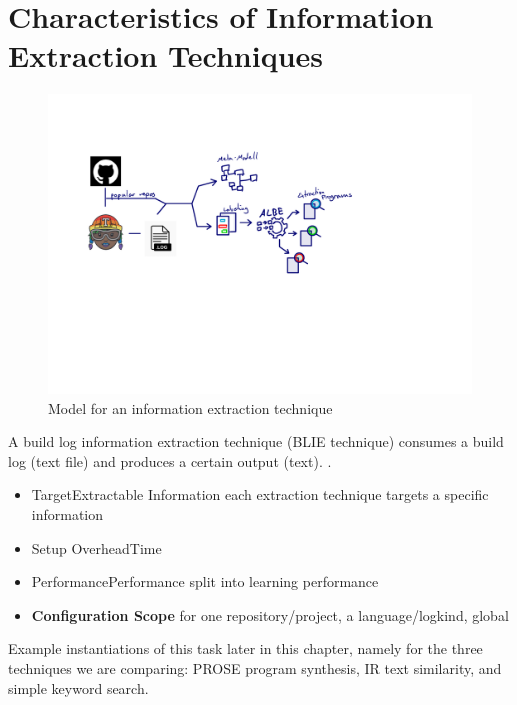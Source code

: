 \documentclass[\myrootdir/main.tex]{subfiles}
\begin{document}
\section{Characteristics of Information Extraction Techniques}
\begin{figure}[h]
	\centering
	\includegraphics[page=3, width=\textwidth, trim={0.5cm 0.5cm 0.5cm 0.5cm}, clip]{img/flow-of-research.pdf}
	\caption{Model for an information extraction technique}
	\label{fig:model-ie-technique}
\end{figure}
A build log information extraction technique (BLIE technique) consumes a build log (text file) and produces a certain output (text). .
\begin{itemize}
	\item{Target}{Extractable Information} each extraction technique  targets a specific information
	\item{Setup Overhead}{Time}
	\item{Performance}{Performance} split into learning performance
	\item \textbf{Configuration Scope} for one repository/project, a language/logkind, global
\end{itemize}

Example instantiations of this task later in this chapter, namely for the three techniques we are comparing: PROSE program synthesis, IR text similarity, and simple keyword search. 
\end{document}
